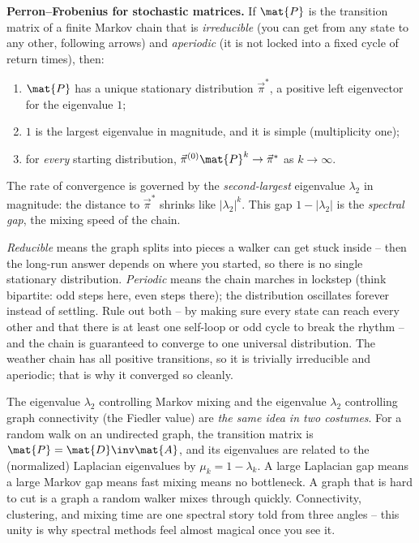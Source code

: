 \begin{formalbox}
\textbf{Perron--Frobenius for stochastic matrices.} If $\mat{P}$ is the transition matrix of
a finite Markov chain that is \emph{irreducible} (you can get from any state to any other,
following arrows) and \emph{aperiodic} (it is not locked into a fixed cycle of return
times), then:
\begin{enumerate}
\item $\mat{P}$ has a unique stationary distribution $\vec\pi^\ast$, a positive left
eigenvector for the eigenvalue $1$;
\item $1$ is the largest eigenvalue in magnitude, and it is simple (multiplicity one);
\item for \emph{every} starting distribution, $\vec\pi^{(0)}\mat{P}^k \to \vec\pi^\ast$ as
$k \to \infty$.
\end{enumerate}
The rate of convergence is governed by the \emph{second-largest} eigenvalue $\lambda_2$ in
magnitude: the distance to $\vec\pi^\ast$ shrinks like $|\lambda_2|^k$. This gap
$1 - |\lambda_2|$ is the \emph{spectral gap}, the mixing speed of the chain.
\end{formalbox}

\begin{intuitionbox}
\emph{Reducible} means the graph splits into pieces a walker can get stuck inside -- then
the long-run answer depends on where you started, so there is no single stationary
distribution. \emph{Periodic} means the chain marches in lockstep (think bipartite: odd
steps here, even steps there); the distribution oscillates forever instead of settling.
Rule out both -- by making sure every state can reach every other and that there is at least
one self-loop or odd cycle to break the rhythm -- and the chain is guaranteed to converge to
one universal distribution. The weather chain has all positive transitions, so it is
trivially irreducible and aperiodic; that is why it converged so cleanly.
\end{intuitionbox}

\begin{connectionbox}
The eigenvalue $\lambda_2$ controlling Markov mixing and the eigenvalue $\lambda_2$
controlling graph connectivity (the Fiedler value) are \emph{the same idea in two
costumes}. For a random walk on an undirected graph, the transition matrix is
$\mat{P} = \mat{D}\inv\mat{A}$, and its eigenvalues are related to the (normalized)
Laplacian eigenvalues by $\mu_k = 1 - \lambda_k$. A large Laplacian gap means a large
Markov gap means fast mixing means no bottleneck. A graph that is hard to cut is a graph a
random walker mixes through quickly. Connectivity, clustering, and mixing time are one
spectral story told from three angles -- this unity is why spectral methods feel almost
magical once you see it.
\end{connectionbox}


